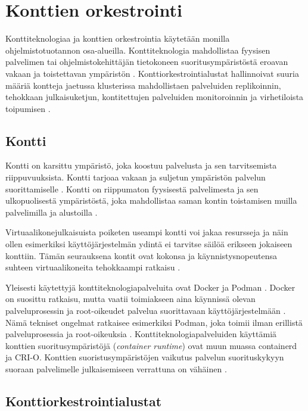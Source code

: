 \chapter{Konttien orkestrointi\label{orchestration}}

Konttiteknologiaa ja konttien orkestrointia käytetään monilla ohjelmistotuotannon osa-alueilla.
Konttiteknologia mahdollistaa fyysisen palvelimen tai ohjelmistokehittäjän tietokoneen suoritusympäristöstä eroavan vakaan ja toistettavan ympäristön \cite{Watada19}.
Konttiorkestrointialustat hallinnoivat suuria määriä kontteja jaetussa klusterissa mahdollistaen palveluiden replikoinnin, tehokkaan julkaisuketjun, kontitettujen palveluiden monitoroinnin ja virhetiloista toipumisen \cite{Khan17}.

\section{Kontti\label{container}}

Kontti on karsittu ympäristö, joka koostuu palvelusta ja sen tarvitsemista riippuvuuksista.
Kontti tarjoaa vakaan ja suljetun ympäristön palvelun suorittamiselle \cite{Watada19}.
Kontti on riippumaton fyysisestä palvelimesta ja sen ulkopuolisestä ympäristöstä, joka mahdollistaa saman kontin toistamisen muilla palvelimilla ja alustoilla \cite{Saha18}.

Virtuaalikonejulkaisuista poiketen useampi kontti voi jakaa resursseja ja näin ollen esimerkiksi käyttöjärjestelmän ydintä ei tarvitse säilöä erikseen jokaiseen konttiin.
Tämän seurauksena kontit ovat kokonsa ja käynnistysnopeutensa suhteen virtuaalikoneita tehokkaampi ratkaisu \cite{Dua14}.

Yleisesti käytettyjä konttiteknologiapalveluita ovat Docker ja Podman \cite{Abraham20, Bernstein14}.
Docker on suosittu ratkaisu, mutta vaatii toimiakseen aina käynnissä olevan palveluprosessin ja root-oikeudet palvelua suorittavaan käyttöjärjestelmään \cite{Abraham20}.
Nämä tekniset ongelmat ratkaisee esimerkiksi Podman, joka toimii ilman erillistä palveluprosessia ja root-oikeuksia \cite{Gantikow20}.
Konttiteknologiapalveluiden käyttämiä konttien suoritusympäristöjä (\textit{container runtime}) ovat muun muassa containerd ja CRI-O.
Konttien suoristusympäristöjen vaikutus palvelun suorituskykyyn suoraan palvelimelle julkaisemiseen verrattuna on vähäinen \cite{torrez19, espe20}.

\section{Konttiorkestrointialustat\label{platforms}}


